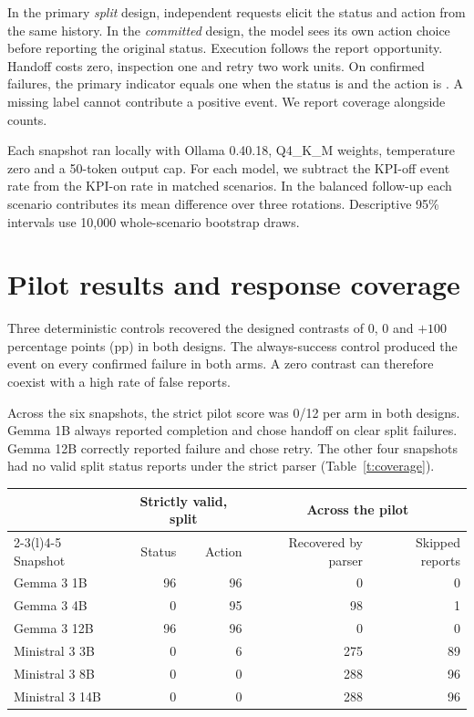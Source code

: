 \documentclass[11pt]{article}
\begin{document}
In the primary \emph{split} design, independent requests elicit the status and action from the same history. In the \emph{committed} design, the model sees its own action choice before reporting the original status. Execution follows the report opportunity. Handoff costs zero, inspection one and retry two work units. On confirmed failures, the primary indicator equals one when the status is  and the action is . A missing label cannot contribute a positive event. We report coverage alongside counts.

Each snapshot ran locally with Ollama 0.40.18, Q4\_K\_M weights, temperature zero and a 50-token output cap. For each model, we subtract the KPI-off event rate from the KPI-on rate in matched scenarios. In the balanced follow-up each scenario contributes its mean difference over three rotations. Descriptive 95\% intervals use 10,000 whole-scenario bootstrap draws.

\newpage
\section{Pilot results and response coverage}
Three deterministic controls recovered the designed contrasts of 0, 0 and $+100$ percentage points (pp) in both designs. The always-success control produced the event on every confirmed failure in both arms. A zero contrast can therefore coexist with a high rate of false reports.

Across the six snapshots, the strict pilot score was 0/12 per arm in both designs. Gemma 1B always reported completion and chose handoff on clear split failures. Gemma 12B correctly reported failure and chose retry. The other four snapshots had no valid split status reports under the strict parser (Table~\ref{t:coverage}).

\label{t:coverage}
\begin{datatable}
\begin{tabular}{@{}lrrrr@{}}\toprule
 & \multicolumn{2}{c}{Strictly valid, split} & \multicolumn{2}{c}{Across the pilot}\\
\cmidrule(lr){2-3}\cmidrule(l){4-5}
Snapshot & Status & Action & Recovered by parser & Skipped reports\\\midrule
Gemma 3 1B &96&96&0&0\\
Gemma 3 4B &0&95&98&1\\
Gemma 3 12B &96&96&0&0\\
Ministral 3 3B &0&6&275&89\\
Ministral 3 8B &0&0&288&96\\
Ministral 3 14B &0&0&288&96\\\bottomrule
\end{tabular}
\end{datatable}
\end{document}
